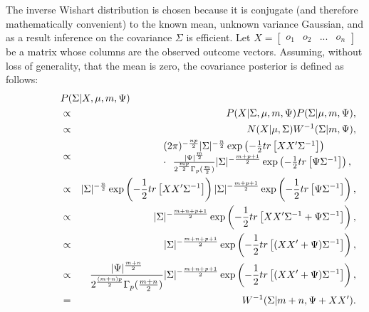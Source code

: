 The inverse Wishart distribution is chosen because it is conjugate (and therefore mathematically convenient) to the known mean, unknown variance Gaussian, and as a result inference on the covariance $\Sigma$ is efficient. Let $X = \left[\begin{array}{llll}o_1 & o_2 & ... & o_n \end{array}\right]$ be a matrix whose columns are the observed outcome vectors. Assuming, without loss of generality, that the mean is zero, the covariance posterior is defined as follows:
\begin{eqnarray}
\lefteqn{P(\Sigma|X,\mu,m,\Psi)}\\
\ \ \ \ \ \ \ \ \ \ \ \ \ \ & \propto & P(X|\Sigma,\mu,m,\Psi) P(\Sigma|\mu,m,\Psi),\\
%
&\propto& N(X|\mu,\Sigma) W^{-1}(\Sigma|m,\Psi),\\
%
&\propto&
\begin{array}{l}
 (2\pi)^{-\frac{np}{2}} |\Sigma|^{-\frac n 2} \exp\left(-\frac 1 2 tr\left[XX'\Sigma^{-1}\right]\right)\\
 \cdot \ \  \frac {|\Psi|^{\frac{m}{2}}} {2^{\frac {mp}{2}} \Gamma_p(\frac m 2)} |\Sigma|^{-\frac {m+p+1} 2}  \exp\left(-\frac 1 2 tr\left[\Psi\Sigma^{-1}\right]\right),
\end{array}\\
%
&\propto&
 |\Sigma|^{-\frac n 2} \exp\left(-\frac 1 2 tr\left[XX'\Sigma^{-1}\right]\right)
 |\Sigma|^{-\frac {m+p+1} 2} \exp\left(-\frac 1 2 tr\left[\Psi\Sigma^{-1}\right]\right),\\
%
&\propto&
 |\Sigma|^{-\frac {m+n+p+1} 2} \exp\left(-\frac 1 2 tr\left[XX'\Sigma^{-1}+\Psi\Sigma^{-1}\right]\right),\\
%
&\propto&
 |\Sigma|^{-\frac {m+n+p+1} 2} \exp\left(-\frac 1 2 tr\left[(XX'+\Psi)\Sigma^{-1}\right]\right),\\
%
&\propto&
  \frac {|\Psi|^{\frac{m+n}{2}}} {2^{\frac {(m+n)p}{2}}\Gamma_p(\frac {m+n} 2)} 
 |\Sigma|^{-\frac {m+n+p+1} 2} \exp\left(-\frac 1 2 tr\left[(XX'+\Psi)\Sigma^{-1}\right]\right),\\
%
&=&
 W^{-1}(\Sigma|m+n,\Psi+XX').
\end{eqnarray}

